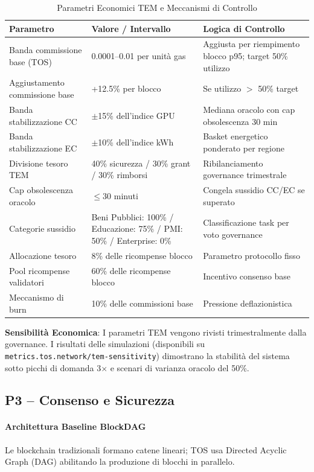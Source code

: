 \documentclass[11pt]{article}
\begin{document}
\begin{table}[H]
\centering
\caption{Parametri Economici TEM e Meccanismi di Controllo}
\label{tab:tem-parameters}
\begin{tabular}{@{}p{}p{}p{}@{}}
\toprule
\textbf{Parametro} & \textbf{Valore / Intervallo} & \textbf{Logica di Controllo} \\ \midrule
Banda commissione base (TOS) & 0.0001--0.01 per unità gas & Aggiusta per riempimento blocco p95; target 50\% utilizzo \\
Aggiustamento commissione base & +12.5\% per blocco & Se utilizzo $>$ 50\% target \\
Banda stabilizzazione CC & $\pm$15\% dell'indice GPU & Mediana oracolo con cap obsolescenza 30 min \\
Banda stabilizzazione EC & $\pm$10\% dell'indice kWh & Basket energetico ponderato per regione \\
Divisione tesoro TEM & 40\% sicurezza / 30\% grant / 30\% rimborsi & Ribilanciamento governance trimestrale \\
Cap obsolescenza oracolo & $\le$30 minuti & Congela sussidio CC/EC se superato \\
Categorie sussidio & Beni Pubblici: 100\% / Educazione: 75\% / PMI: 50\% / Enterprise: 0\% & Classificazione task per voto governance \\
Allocazione tesoro & 8\% delle ricompense blocco & Parametro protocollo fisso \\
Pool ricompense validatori & 60\% delle ricompense blocco & Incentivo consenso base \\
Meccanismo di burn & 10\% delle commissioni base & Pressione deflazionistica \\
\bottomrule
\end{tabular}
\end{table}

\textbf{Sensibilità Economica}: I parametri TEM vengono rivisti trimestralmente dalla governance. I risultati delle simulazioni (disponibili su \texttt{metrics.tos.network/tem-sensitivity}) dimostrano la stabilità del sistema sotto picchi di domanda 3$\times$ e scenari di varianza oracolo del 50\%.

\subsection{P3 -- Consenso e Sicurezza}
\label{sec:pillar-consensus}

\paragraph{Architettura Baseline BlockDAG}
Le blockchain tradizionali formano catene lineari; TOS usa Directed Acyclic Graph (DAG) abilitando la produzione di blocchi in parallelo.
\end{document}

